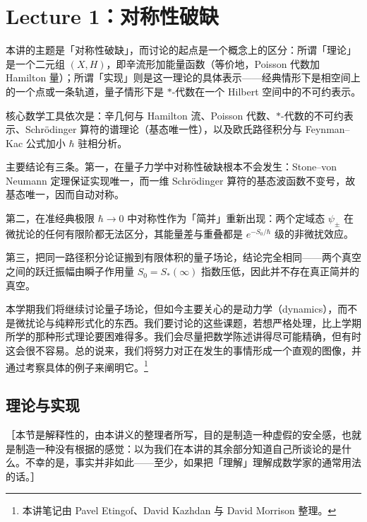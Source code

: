 \section{Lecture 1：对称性破缺}

\begin{keytakeaways}
本讲的主题是「对称性破缺」，而讨论的起点是一个概念上的区分：所谓「理论」是一个二元组 $(X,H)$，即辛流形加能量函数（等价地，Poisson 代数加 Hamilton 量）；所谓「实现」则是这一理论的具体表示——经典情形下是相空间上的一个点或一条轨道，量子情形下是 $*$-代数在一个 Hilbert 空间中的不可约表示。

核心数学工具依次是：辛几何与 Hamilton 流、Poisson 代数、$*$-代数的不可约表示、Schrödinger 算符的谱理论（基态唯一性），以及欧氏路径积分与 Feynman–Kac 公式加小 $\hbar$ 驻相分析。

主要结论有三条。第一，在量子力学中对称性破缺根本不会发生：Stone–von Neumann 定理保证实现唯一，而一维 Schrödinger 算符的基态波函数不变号，故基态唯一，因而自动对称。

第二，在准经典极限 $\hbar\to0$ 中对称性作为「简并」重新出现：两个定域态 $\psi_\pm$ 在微扰论的任何有限阶都无法区分，其能量差与重叠都是 $e^{-S_0/\hbar}$ 级的非微扰效应。

第三，把同一路径积分论证搬到有限体积的量子场论，结论完全相同——两个真空之间的跃迁振幅由瞬子作用量 $S_0=S_*(\infty)$ 指数压低，因此并不存在真正简并的真空。
\end{keytakeaways}


本学期我们将继续讨论量子场论，但如今主要关心的是动力学（dynamics），而不是微扰论与纯粹形式化的东西。我们要讨论的这些课题，若想严格处理，比上学期所学的那种形式理论要困难得多。我们会尽量把数学陈述讲得尽可能精确，但有时这会很不容易。总的说来，我们将努力对正在发生的事情形成一个直观的图像，并通过考察具体的例子来阐明它。\footnote{本讲笔记由 Pavel Etingof、David Kazhdan 与 David Morrison 整理。}

\subsection{理论与实现}

［本节是解释性的，由本讲义的整理者所写，目的是制造一种虚假的安全感，也就是制造一种没有根据的感觉：以为我们在本讲的其余部分知道自己所谈论的是什么。不幸的是，事实并非如此——至少，如果把「理解」理解成数学家的通常用法的话。］

